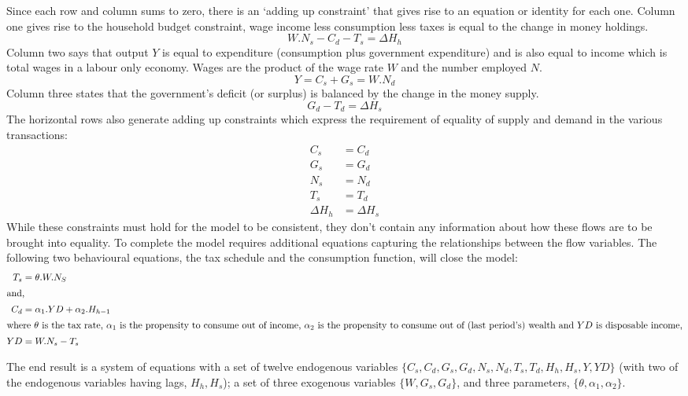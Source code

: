 \documentclass[twoside,a4paper,11pt]{article}
\begin{document}
Since each row and column sums to zero, there is an \lq adding up constraint' that gives rise to an equation or identity for each one. Column one gives rise to the household budget constraint, wage income less consumption less taxes is equal to the change in money holdings.
$$W.N_s - C_d -T_s = \Delta H_h$$
Column two says that output $Y$ is equal to expenditure (consumption plus government expenditure) and is also equal to income which is  total wages in a labour only economy. Wages are the product of the wage rate $W$ and the number employed $N$.
$$Y = C_s + G_s = W.N_d$$
Column three states that the government's deficit (or surplus) is balanced by the change in the money supply.
$$ G_d -T_d = \Delta H_s $$
The horizontal rows also generate adding up constraints which express the requirement of equality of supply and demand in the various transactions:
\begin{align*}
C_s & = C_d\\
G_s & = G_d\\
N_s & = N_d\\
T_s & = T_d\\
\Delta H_h & = \Delta H_s
\end{align*}
While these constraints must hold for the model to be consistent, they don't contain any information about how these flows are to be brought into equality. To complete the model requires additional equations capturing the relationships between the flow variables. The following two behavioural equations, the tax schedule and the consumption function, will close the model:
\begin{align*}
T_s & = \theta.W.N_S\\
\intertext{and,}
C_d & = \alpha_1.YD + \alpha_2.H_{h-1}\\
\intertext{where $\theta$ is the tax rate, $\alpha_1$ is the propensity to consume out of income, $\alpha_2$ is the propensity to consume out of (last period's) wealth and $YD$ is disposable income,}
YD & = W.N_s -T_s
\end{align*}

The end result is a system of equations with a set of twelve endogenous variables
$\{C_s, C_d, G_s, G_d, N_s, N_d, T_s, T_d, H_h, H_s, Y, YD\}$ (with two of the endogenous variables having lags, $H_h, H_s$); a set of three exogenous variables $\{W, G_s, G_d\}$, 
and three parameters, $\{\theta, \alpha_1, \alpha_2 \}$.
\end{document}

